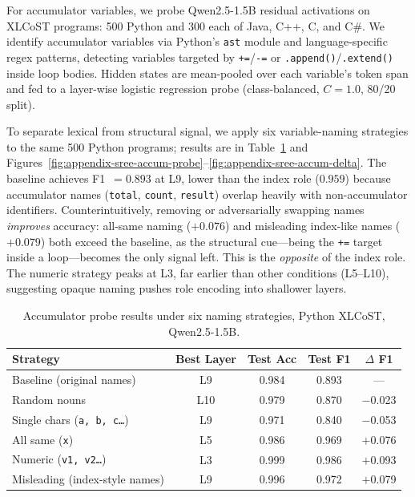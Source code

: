
\label{sec:accum}
For accumulator variables, we probe Qwen2.5-1.5B residual activations on XLCoST
programs: 500 Python and 300 each of Java, C++, C, and C\#. We identify
accumulator variables via Python's \texttt{ast} module and language-specific
regex patterns, detecting variables targeted by \texttt{+=}/\texttt{-=} or
\texttt{.append()}/\texttt{.extend()} inside loop bodies. Hidden states are
mean-pooled over each variable's token span and fed to a layer-wise logistic
regression probe (class-balanced, $C{=}1.0$, 80/20 split).

To separate lexical from structural signal, we apply six variable-naming
strategies to the same 500 Python programs; results are in
Table~\ref{tab:accum-perturbation} and
Figures~\ref{fig:appendix-sree-accum-probe}--\ref{fig:appendix-sree-accum-delta}.
The baseline achieves F1~$= 0.893$ at L9, lower than the index role ($0.959$)
because accumulator names (\texttt{total}, \texttt{count}, \texttt{result})
overlap heavily with non-accumulator identifiers. Counterintuitively, removing
or adversarially swapping names \emph{improves} accuracy: all-same naming
($+0.076$) and misleading index-like names ($+0.079$) both exceed the baseline,
as the structural cue---being the \texttt{+=} target inside a loop---becomes the
only signal left. This is the \emph{opposite} of the index role. The numeric
strategy peaks at L3, far earlier than other conditions (L5--L10), suggesting
opaque naming pushes role encoding into shallower layers.

\begin{table}[t]
\centering
\caption{Accumulator probe results under six naming strategies, Python XLCoST,
Qwen2.5-1.5B.}
\label{tab:accum-perturbation}
\begin{tabular}{lcccc}
\toprule
Strategy & Best Layer & Test Acc & Test F1 & $\Delta$ F1 \\
\midrule
Baseline (original names)           & L9  & 0.984 & 0.893 & ---     \\
Random nouns                        & L10 & 0.979 & 0.870 & $-$0.023 \\
Single chars (\texttt{a, b, c\ldots}) & L9  & 0.971 & 0.840 & $-$0.053 \\
All same (\texttt{x})               & L5  & 0.986 & 0.969 & $+$0.076 \\
Numeric (\texttt{v1, v2\ldots})     & L3  & 0.999 & 0.986 & $+$0.093 \\
Misleading (index-style names)      & L9  & 0.996 & 0.972 & $+$0.079 \\
\bottomrule
\end{tabular}
\end{table}

